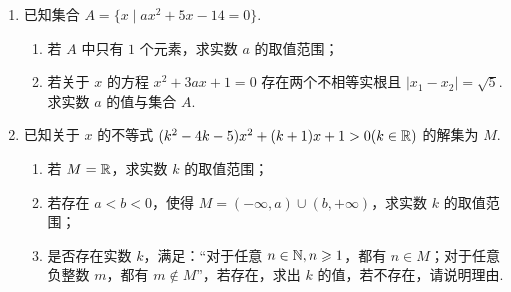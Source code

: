 \documentclass[a4paper,11pt]{article}
\begin{document}
\begin{enumerate}
\fi

\ansspace[6]

\item 已知集合 $A=\{x\mid ax^2+5x-14=0\}$.

\begin{enumerate}[label=(\arabic*)]
\item 若 $A$ 中只有 $1$ 个元素，求实数 $a$ 的取值范围；
\item 若关于 $x$ 的方程 $x^2+3ax+1=0$ 存在两个不相等实根且
$|x_1-x_2|=\sqrt5$. 求实数 $a$ 的值与集合 $A$.
\end{enumerate}

\ifanswer
\solbegin
{}
\solend

\fi

\ansspace[6]

\item 已知关于 $x$ 的不等式 $(k^2-4k-5)x^2+(k+1)x+1>0(k\in\mathbb{R})$ 的解集为 $M$.

\begin{enumerate}[label=(\arabic*)]
\item 若 $M=\mathbb{R}$，求实数 $k$ 的取值范围；
\item 若存在 $a<b<0$，使得 $M=(-\infty,a)\cup(b,+\infty)$，求实数 $k$ 的取值范围；
\item 是否存在实数 $k$，满足：“对于任意 $n\in\mathbb{N},n\geqslant1$，都有 $n\in M$；对于任意
负整数 $m$，都有 $m\notin M$”，若存在，求出 $k$ 的值，若不存在，请说明理由.
\end{enumerate}


\end{enumerate}
\end{document}
